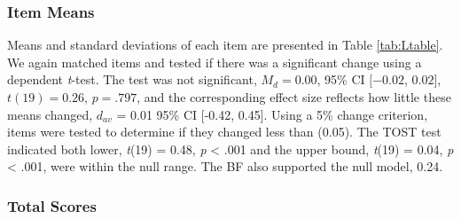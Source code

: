 \documentclass[english,man, mask]{apa6}
\theoremstyle{definition}
\theoremstyle{definition}
\theoremstyle{definition}
\theoremstyle{remark}
\begin{document}
\subsubsection{Item Means}\label{item-means-1}

Means and standard deviations of each item are presented in Table
\ref{tab:Ltable}. We again matched items and tested if there was a
significant change using a dependent \emph{t}-test. The test was not
significant, \(M_d = 0.00\), 95\% CI \([-0.02\), \(0.02]\),
\(t(19) = 0.26\), \(p = .797\), and the corresponding effect size
reflects how little these means changed, \(d_{av}\) = 0.01 95\% CI
{[}-0.42, 0.45{]}. Using a 5\% change criterion, items were tested to
determine if they changed less than (0.05). The TOST test indicated both
lower, \emph{t}(19) = 0.48, \emph{p} \textless{} .001 and the upper
bound, \emph{t}(19) = 0.04, \emph{p} \textless{} .001, were within the
null range. The BF also supported the null model, 0.24.

\subsubsection{Total Scores}\label{total-scores-1}
\end{document}
